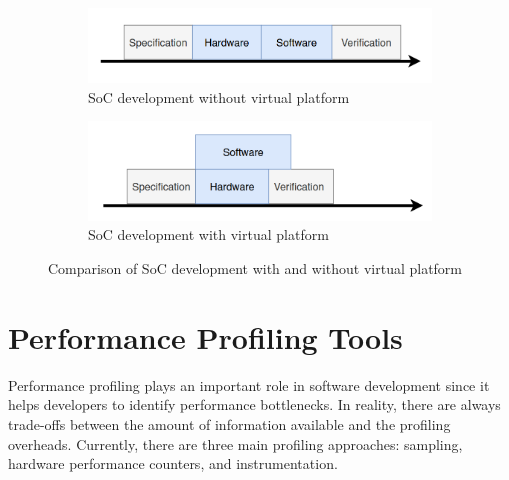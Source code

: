\begin{figure}
    \centering
    \begin{subfigure}[t]{0.8\linewidth}
        \centering
        \includegraphics[width=\linewidth]{figures/Virtual_platform_without.png}
        \caption{\ac{SoC} development without virtual platform}
        \label{fig:virtual_platform_without}
    \end{subfigure}
    \vspace{1em}
    \begin{subfigure}[t]{0.8\linewidth}
        \centering
        \includegraphics[width=\linewidth]{figures/Virtual_platform.png}
        \caption{SoC development with virtual platform}
        \label{fig:virtual_platform}
    \end{subfigure}
    \caption{Comparison of SoC development with and without virtual platform}
    \label{fig:virtual_platform_comparison}
\end{figure}

\section{Performance Profiling Tools}
Performance profiling plays an important role in software development since it helps developers to identify performance bottlenecks. In reality, there are always trade-offs between the amount of information available and the profiling overheads. Currently, there are three main profiling approaches: sampling, hardware performance counters, and instrumentation.

